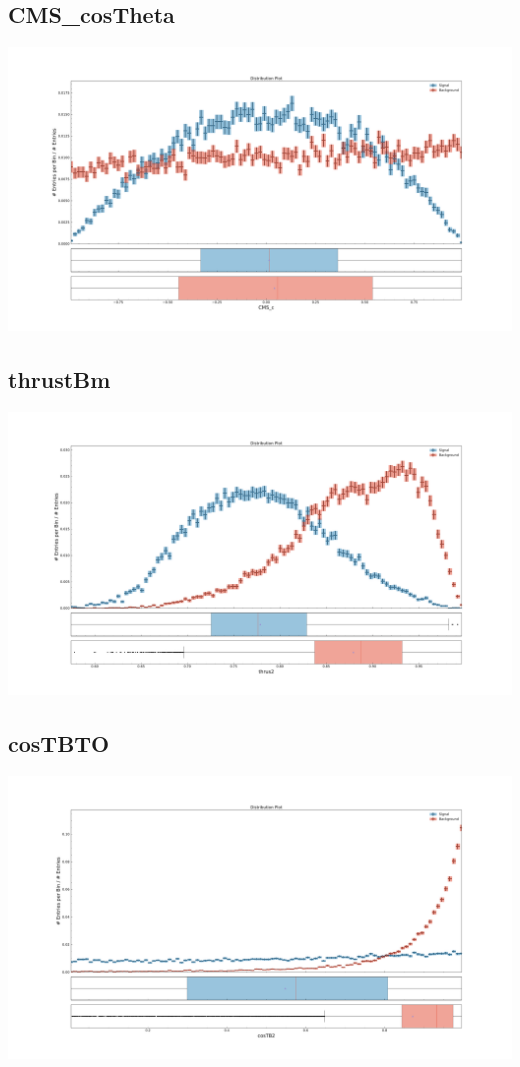 \documentclass[10pt,a4paper]{article}
\begin{document}
\subsection{CMS\_cosTheta}
\begin{center}
\includegraphics[width=1.0\textwidth]{variable_8064387156488420079.pdf}
\end{center}
\subsection{thrustBm}
\begin{center}
\includegraphics[width=1.0\textwidth]{variable_-5586688839139693641.pdf}
\end{center}
\subsection{cosTBTO}
\begin{center}
\includegraphics[width=1.0\textwidth]{variable_-448030578511342677.pdf}
\end{center}
\end{document}
